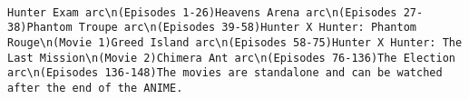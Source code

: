 \documentclass[
]{article}
\begin{document}
\begin{verbatim}
                                                                                                                                                                                                                                                                                                                                                                                                                                                                                                                                                                                                                                                                                                                                                                                                                                                                                                                                                                                                                                                                                                                                                                                                                                                                                                                                                                         Hunter Exam arc\n(Episodes 1-26)Heavens Arena arc\n(Episodes 27-38)Phantom Troupe arc\n(Episodes 39-58)Hunter X Hunter: Phantom Rouge\n(Movie 1)Greed Island arc\n(Episodes 58-75)Hunter X Hunter: The Last Mission\n(Movie 2)Chimera Ant arc\n(Episodes 76-136)The Election arc\n(Episodes 136-148)The movies are standalone and can be watched after the end of the ANIME.

\end{verbatim}
\end{document}
